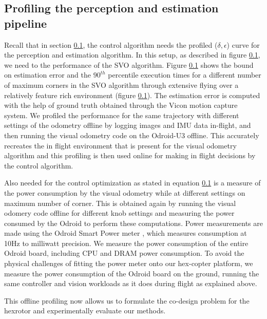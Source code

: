 \subsection{Profiling the perception and estimation pipeline}

Recall that in section \ref{}, the control algorithm needs the profiled ($\delta,\epsilon$) curve for the perception and estimation algorithm. In this setup, as described in figure \ref{}, we need to the performance of the SVO algorithm. Figure \ref{} shows the bound on estimation error and the $90^{th}$ percentile execution times for a different number of maximum corners in the SVO algorithm through extensive flying over a relatively feature rich environment (figure \ref{}). The estimation error is computed with the help of ground truth obtained through the Vicon motion capture system. We profiled the performance for the same trajectory with different settings of the odometry offline by logging images and IMU data in-flight, and then running the visual odometry code on the Odroid-U3 offline.
This accurately recreates the in flight environment that is present for the visual odometry algorithm and this profiling is then used online for making in flight decisions by the control algorithm.

Also needed for the control optimization as stated in equation \ref{} is a measure of the power consumption by the visual odometry while at different settings on maximum number of corner. This is obtained again by running the visual odomery code offline for different knob settings and measuring the power consumed by the Odroid to perform these computations. Power measurements are made using the Odroid Smart Power meter \cite{OdroidSmartPower}, which measures consumption at 10Hz to milliwatt precision. We measure the power consumption of the entire Odroid board, including CPU and DRAM power consumption. To avoid the physical challenges of fitting the power meter onto our hex-copter platform, we measure the power consumption of the Odroid board on the ground, running the same controller and vision workloads as it does during flight as explained above.

This offline profiling now allows us to formulate the co-design problem for the hexrotor and experimentally evaluate our methods.


